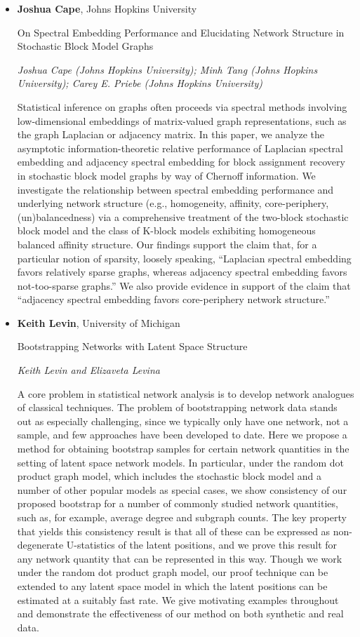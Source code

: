 \begin{itemize}
\item \textbf{Joshua Cape}, Johns Hopkins University

On Spectral Embedding Performance and Elucidating Network Structure in Stochastic Block Model Graphs

\emph{\footnotesize Joshua Cape (Johns Hopkins University); Minh Tang (Johns Hopkins University); Carey E. Priebe (Johns Hopkins University)}

Statistical inference on graphs often proceeds via spectral methods involving low-dimensional embeddings of matrix-valued graph representations, such as the graph Laplacian or adjacency matrix. In this paper, we analyze the asymptotic information-theoretic relative performance of Laplacian spectral embedding and adjacency spectral embedding for block assignment recovery in stochastic block model graphs by way of Chernoff information. We investigate the relationship between spectral embedding performance and underlying network structure (e.g., homogeneity, affinity, core-periphery, (un)balancedness) via a comprehensive treatment of the two-block stochastic block model and the class of K-block models exhibiting homogeneous balanced affinity structure. Our findings support the claim that, for a particular notion of sparsity, loosely speaking, ``Laplacian spectral embedding favors relatively sparse graphs, whereas adjacency spectral embedding favors not-too-sparse graphs.'' We also provide evidence in support of the claim that ``adjacency spectral embedding favors core-periphery network structure.''

\item \textbf{Keith Levin}, University of Michigan

Bootstrapping Networks with Latent Space Structure

\emph{\footnotesize Keith Levin and Elizaveta Levina}

A core problem in statistical network analysis is to develop network analogues of classical techniques. The problem of bootstrapping network data stands out as especially challenging, since we typically only have one network, not a sample, and few approaches have been developed to date. Here we propose a method for obtaining bootstrap samples for certain network quantities in the setting of latent space network models.  In particular, under the random dot product graph model, which includes the stochastic block model and a number of other popular models as special cases, we show consistency of our proposed bootstrap for a number of commonly studied network quantities, such as, for example, average degree and subgraph counts. The key property that yields this consistency result is that all of these can be expressed as non-degenerate U-statistics of the latent positions, and we prove this result for any network quantity that can be represented in this way. Though we work under the random dot product graph model, our proof technique can be extended to any latent space model in which the latent positions can be estimated at a suitably fast rate.  We give motivating examples throughout and demonstrate the effectiveness of our method on both synthetic and real data.

\end{itemize}

